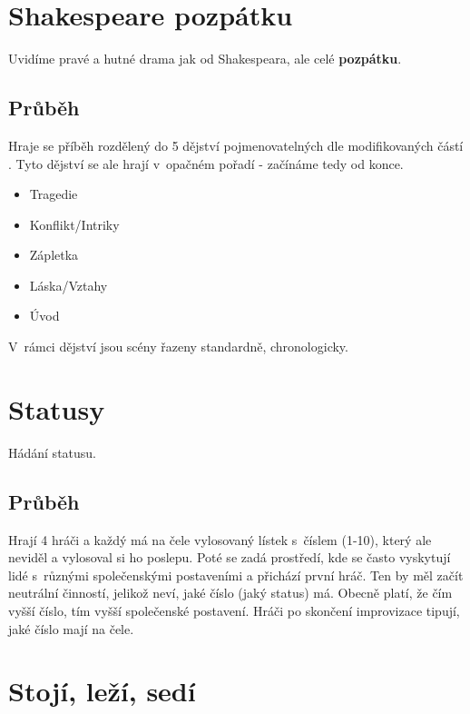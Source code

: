 \needspace{5cm} \section{Shakespeare pozpátku} \label{shakespeare pozpátku}  
 
Uvidíme pravé a hutné drama jak od Shakespeara, ale celé \textbf{pozpátku}. 
\subsection{Průběh} Hraje se příběh rozdělený do 5 dějství pojmenovatelných dle modifikovaných částí .  
Tyto dějství se ale hrají v~opačném pořadí - začínáme tedy od konce.  
\begin{itemize}
\item Tragedie
\item Konflikt/Intriky
\item Zápletka
\item Láska/Vztahy
\item Úvod
\end{itemize}
 
V~rámci dějství jsou scény řazeny standardně, chronologicky.  
 
 
 
\needspace{5cm} \section{Statusy} \label{statusy}  
 
 
Hádání statusu. 
 
 
\subsection{ Průběh }  
Hrají 4 hráči a každý má na čele vylosovaný lístek s~číslem (1-10), který ale neviděl a vylosoval si ho poslepu. Poté se zadá prostředí, kde se často vyskytují lidé s~různými společenskými postaveními a přichází první hráč. Ten by měl začít neutrální činností, jelikož neví, jaké číslo (jaký status) má. Obecně platí, že čím vyšší číslo, tím vyšší společenské postavení. Hráči po skončení improvizace tipují, jaké číslo mají na čele. 
 
 
 
\needspace{5cm} \section{Stojí, leží, sedí} \label{stojí, leží, sedí}  
 
